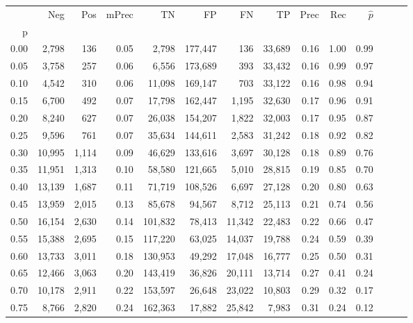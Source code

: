 \begin{tabular}{rrrrrrrrrrrrrr}
\toprule
{} &     Neg &    Pos & mPrec &       TN &       FP &      FN &      TP &  Prec &   Rec & $\hat{p}$ \\
p    &         &        &       &          &          &         &         &       &       &           \\
\midrule
0.00 &   2,798 &    136 &  0.05 &    2,798 &  177,447 &     136 &  33,689 &  0.16 &  1.00 &      0.99 \\
0.05 &   3,758 &    257 &  0.06 &    6,556 &  173,689 &     393 &  33,432 &  0.16 &  0.99 &      0.97 \\
0.10 &   4,542 &    310 &  0.06 &   11,098 &  169,147 &     703 &  33,122 &  0.16 &  0.98 &      0.94 \\
0.15 &   6,700 &    492 &  0.07 &   17,798 &  162,447 &   1,195 &  32,630 &  0.17 &  0.96 &      0.91 \\
0.20 &   8,240 &    627 &  0.07 &   26,038 &  154,207 &   1,822 &  32,003 &  0.17 &  0.95 &      0.87 \\
0.25 &   9,596 &    761 &  0.07 &   35,634 &  144,611 &   2,583 &  31,242 &  0.18 &  0.92 &      0.82 \\
0.30 &  10,995 &  1,114 &  0.09 &   46,629 &  133,616 &   3,697 &  30,128 &  0.18 &  0.89 &      0.76 \\
0.35 &  11,951 &  1,313 &  0.10 &   58,580 &  121,665 &   5,010 &  28,815 &  0.19 &  0.85 &      0.70 \\
0.40 &  13,139 &  1,687 &  0.11 &   71,719 &  108,526 &   6,697 &  27,128 &  0.20 &  0.80 &      0.63 \\
0.45 &  13,959 &  2,015 &  0.13 &   85,678 &   94,567 &   8,712 &  25,113 &  0.21 &  0.74 &      0.56 \\
0.50 &  16,154 &  2,630 &  0.14 &  101,832 &   78,413 &  11,342 &  22,483 &  0.22 &  0.66 &      0.47 \\
0.55 &  15,388 &  2,695 &  0.15 &  117,220 &   63,025 &  14,037 &  19,788 &  0.24 &  0.59 &      0.39 \\
0.60 &  13,733 &  3,011 &  0.18 &  130,953 &   49,292 &  17,048 &  16,777 &  0.25 &  0.50 &      0.31 \\
0.65 &  12,466 &  3,063 &  0.20 &  143,419 &   36,826 &  20,111 &  13,714 &  0.27 &  0.41 &      0.24 \\
0.70 &  10,178 &  2,911 &  0.22 &  153,597 &   26,648 &  23,022 &  10,803 &  0.29 &  0.32 &      0.17 \\
0.75 &   8,766 &  2,820 &  0.24 &  162,363 &   17,882 &  25,842 &   7,983 &  0.31 &  0.24 &      0.12 \\

\end{tabular}
